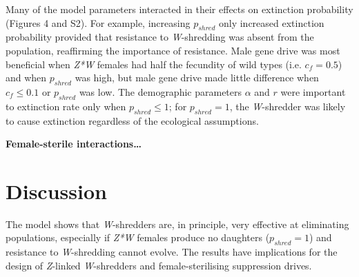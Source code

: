 \documentclass[]{rsos}%
\begin{document}
Many of the model parameters interacted in their effects on extinction
probability (Figures 4 and S2). For example, increasing \(p_{shred}\)
only increased extinction probability provided that resistance to
\emph{W}-shredding was absent from the population, reaffirming the
importance of resistance. Male gene drive was most beneficial when
\emph{Z*W} females had half the fecundity of wild types (i.e.
\(c_f = 0.5\)) and when \(p_{shred}\) was high, but male gene drive made
little difference when \(c_f \le 0.1\) or \(p_{shred}\) was low. The
demographic parameters \(\alpha\) and \(r\) were important to extinction
rate only when \(p_{shred} \le 1\); for \(p_{shred} = 1\), the
\emph{W}-shredder was likely to cause extinction regardless of the
ecological assumptions.

\textbf{Female-sterile interactions\ldots{}}

\hypertarget{discussion}{%
\section{Discussion}\label{discussion}}

The model shows that \emph{W}-shredders are, in principle, very
effective at eliminating populations, especially if \emph{Z*W} females
produce no daughters (\(p_{shred} = 1\)) and resistance to
\emph{W}-shredding cannot evolve. The results have implications for the
design of \emph{Z}-linked \emph{W}-shredders and female-sterilising
suppression drives.
\end{document}
